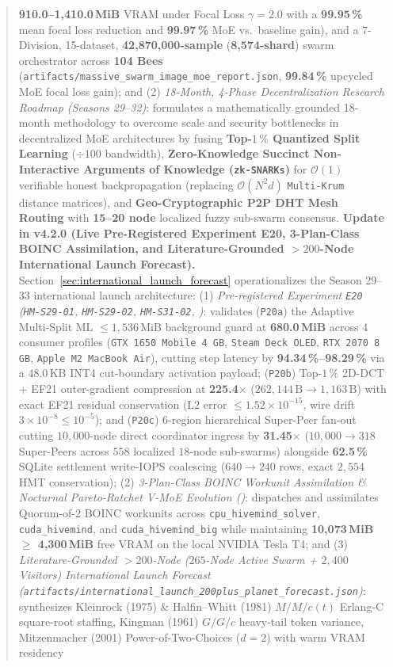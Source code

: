 \documentclass[11pt,a4paper]{article}
\begin{document}
\begin{abstract}
\textbf{910.0--1{,}410.0\,MiB} VRAM under Focal Loss $\gamma=2.0$ with a \textbf{99.95\,\%} mean focal loss reduction and \textbf{99.97\,\%} MoE vs.\ baseline gain), and a 7-Division, 15-dataset, \textbf{42{,}870{,}000-sample} (\textbf{8{,}574-shard}) swarm orchestrator across \textbf{104 Bees} (\texttt{artifacts/massive\_swarm\_image\_moe\_report.json}, \textbf{99.84\,\%} upcycled MoE focal loss gain); and (2) \emph{18-Month, 4-Phase Decentralization Research Roadmap (Seasons 29--32)}: formulates a mathematically grounded 18-month methodology to overcome scale and security bottlenecks in decentralized MoE architectures by fusing \textbf{Top-$1\,\%$ Quantized Split Learning} ($\div 100$ bandwidth), \textbf{Zero-Knowledge Succinct Non-Interactive Arguments of Knowledge (\texttt{zk-SNARKs})} for $\mathcal{O}(1)$ verifiable honest backpropagation (replacing $\mathcal{O}(N^2 d)$ \texttt{Multi-Krum} distance matrices), and \textbf{Geo-Cryptographic P2P DHT Mesh Routing} with \textbf{15--20 node} localized fuzzy sub-swarm consensus. \textbf{Update in v4.2.0 (Live Pre-Registered Experiment E20, 3-Plan-Class BOINC Assimilation, and Literature-Grounded $>200$-Node International Launch Forecast).} Section~\ref{sec:international_launch_forecast} operationalizes the Season 29--33 international launch architecture: (1) \emph{Pre-registered Experiment \texttt{E20} (\texttt{HM-S29-01}, \texttt{HM-S29-02}, \texttt{HM-S31-02}, )}: validates (\texttt{P20a}) the Adaptive Multi-Split ML $\le 1{,}536$\,MiB background guard at \textbf{680.0\,MiB} across 4 consumer profiles (\texttt{GTX 1650 Mobile 4\,GB}, \texttt{Steam Deck OLED}, \texttt{RTX 2070 8\,GB}, \texttt{Apple M2 MacBook Air}), cutting step latency by \textbf{94.34\,\%--98.29\,\%} via a $48.0$\,KB INT4 cut-boundary activation payload; (\texttt{P20b}) Top-$1\,\%$ 2D-DCT + EF21 outer-gradient compression at \textbf{225.4$\times$} ($262{,}144\,\text{B} \to 1{,}163\,\text{B}$) with exact EF21 residual conservation ($\text{L2 error } \le 1.52 \times 10^{-15}$, wire drift $3 \times 10^{-8} \le 10^{-5}$); and (\texttt{P20c}) 6-region hierarchical Super-Peer fan-out cutting $10{,}000$-node direct coordinator ingress by \textbf{31.45$\times$} ($10{,}000 \to 318$ Super-Peers across $558$ localized $18$-node sub-swarms) alongside \textbf{62.5\,\%} SQLite settlement write-IOPS coalescing ($640 \to 240$ rows, exact $2{,}554$\,HMT conservation); (2) \emph{3-Plan-Class BOINC Workunit Assimilation \& Nocturnal Pareto-Ratchet V-MoE Evolution ()}: dispatches and assimilates Quorum-of-2 BOINC workunits across \texttt{cpu\_hivemind\_solver}, \texttt{cuda\_hivemind}, and \texttt{cuda\_hivemind\_big} while maintaining \textbf{10{,}073\,MiB $\ge$ 4{,}300\,MiB} free VRAM on the local NVIDIA Tesla T4; and (3) \emph{Literature-Grounded $>200$-Node ($265$-Node Active Swarm + $2{,}400$ Visitors) International Launch Forecast (\texttt{artifacts/international\_launch\_200plus\_planet\_forecast.json})}: synthesizes Kleinrock (1975) \& Halfin--Whitt (1981) $M/M/c(t)$ Erlang-C square-root staffing, Kingman (1961) $G/G/c$ heavy-tail token variance, Mitzenmacher (2001) Power-of-Two-Choices ($d=2$) with warm VRAM residency 
\end{abstract}
\end{document}
